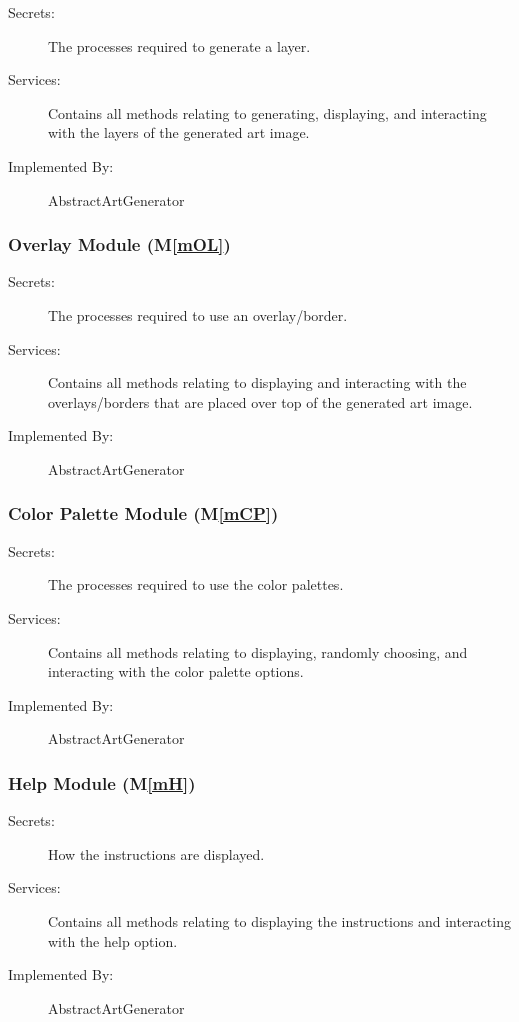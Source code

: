 \documentclass[12pt, titlepage]{article}
\newcommand{\mref}[1]{M\ref{#1}}
\begin{document}
\begin{description}
\item[Secrets:] The processes required to generate a layer.
\item[Services:] Contains all methods relating to generating, displaying, and interacting with the layers of the generated art image.
\item[Implemented By:] AbstractArtGenerator
\end{description}

\subsubsection{Overlay Module (\mref{mOL})}

\begin{description}
\item[Secrets:] The processes required to use an overlay/border.
\item[Services:] Contains all methods relating to displaying and interacting with the overlays/borders that are placed over top of the generated art image.
\item[Implemented By:] AbstractArtGenerator
\end{description}

\subsubsection{Color Palette Module (\mref{mCP})}

\begin{description}
\item[Secrets:] The processes required to use the color palettes.
\item[Services:] Contains all methods relating to displaying, randomly choosing, and interacting with the color palette options.
\item[Implemented By:] AbstractArtGenerator
\end{description}

\subsubsection{Help Module (\mref{mH})}

\begin{description}
\item[Secrets:] How the instructions are displayed.
\item[Services:] Contains all methods relating to displaying the instructions and interacting with the help option.
\item[Implemented By:] AbstractArtGenerator
\end{description}
\end{document}
